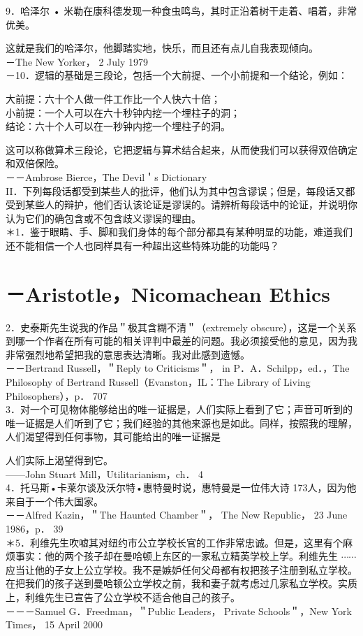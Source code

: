 9．哈泽尔 • 米勒在康科德发现一种食虫鸣鸟，其时正沿着树干走着、唱着，非常优美。

这就是我们的哈泽尔，他脚踏实地，快乐，而且还有点儿自我表现倾向。\\
－The New Yorker， 2 July 1979\\
－10．逻辑的基础是三段论，包括一个大前提、一个小前提和一个结论，例如：

大前提：六十个人做一件工作比一个人快六十倍；\\
小前提：一个人可以在六十秒钟内挖一个埋柱子的洞；\\
结论：六十个人可以在一秒钟内挖一个埋柱子的洞。

这可以称做算术三段论，它把逻辑与算术结合起来，从而使我们可以获得双倍确定和双倍保险。\\
－－Ambrose Bierce，The Devil＇s Dictionary\\
II．下列每段话都受到某些人的批评，他们认为其中包含谬误；但是，每段话又都受到某些人的辩护，他们否认该论证是谬误的。请辨析每段话中的论证，并说明你认为它们的确包含或不包含歧义谬误的理由。\\
＊1．鉴于眼睛、手、脚和我们身体的每个部分都具有某种明显的功能，难道我们还不能相信一个人也同样具有一种超出这些特殊功能的功能吗？

\section*{－Aristotle，Nicomachean Ethics}
2．史泰斯先生说我的作品＂极其含糊不清＂（extremely obscure），这是一个关系到哪一个作者在所有可能的相关评判中最差的问题。我必须接受他的意见，因为我非常强烈地希望把我的意思表达清晰。我对此感到遗憾。\\
－－Bertrand Russell，＂Reply to Criticisms＂， in P．A．Schilpp，ed．，The Philosophy of Bertrand Russell（Evanston，IL：The Library of Living Philosophers），p． 707\\
3．对一个可见物体能够给出的唯一证据是，人们实际上看到了它；声音可听到的唯一证据是人们听到了它；我们经验的其他来源也是如此。同样，按照我的理解，人们渴望得到任何事物，其可能给出的唯一证据是

人们实际上渴望得到它。\\
——John Stuart Mill，Utilitarianism，ch． 4\\
4．托马斯•卡莱尔谈及沃尔特•惠特曼时说，惠特曼是一位伟大诗 173人，因为他来自于一个伟大国家。\\
－－Alfred Kazin，＂The Haunted Chamber＂， The New Republic， 23 June 1986，p． 39\\
＊5．利维先生吹嘘其对纽约市公立学校长官的工作非常忠诚。但是，这里有个麻烦事实：他的两个孩子却在曼哈顿上东区的一家私立精英学校上学。利维先生 $\cdots \cdots$ 应当让他的子女上公立学校。我不是嫉妒任何父母都有权把孩子注册到私立学校。在把我们的孩子送到曼哈顿公立学校之前，我和妻子就考虑过几家私立学校。实质上，利维先生已宣告了公立学校不适合他自己的孩子。\\
－－－Samuel G．Freedman，＂Public Leaders， Private Schools＂，New York Times， 15 April 2000

